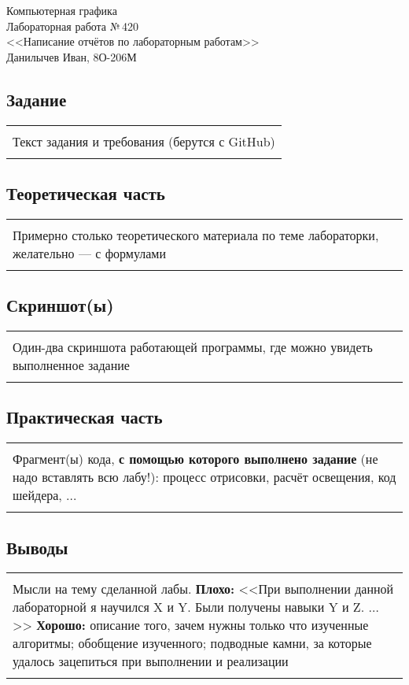 \documentclass[12pt]{article}
\newcommand{\StudentName}{Данилычев Иван}
\newcommand{\Group}{8О-206М}
\newcommand{\CourseName}{Компьютерная графика}
\newcommand{\LabNum}{420}
\newcommand{\Subject}{Написание отчётов по лабораторным работам}
\newcommand{\Descriptive}[2]
{
	\begin{tabularx}{\textwidth}{|X|}
	\hline
	\\[#1em]
	#2 \\
	\\[#1em]
	\hline
	\end{tabularx}
}
\begin{document}
\begin{flushright}
\Large{
	\CourseName \\
	Лабораторная работа №\,\LabNum \\
	<<\Subject>> \\
	\StudentName, \Group \\
}
\end{flushright}

\subsection*{Задание}
\Descriptive{5}{Текст задания и требования (берутся с GitHub)}

\subsection*{Теоретическая часть}
\Descriptive{10}{Примерно столько теоретического материала по теме лабораторки, желательно --- с формулами}

\subsection*{Скриншот(ы)}
\Descriptive{2}{Один-два скриншота работающей программы, где можно увидеть выполненное задание}

\subsection*{Практическая часть}
\Descriptive{15}{Фрагмент(ы) кода, \textbf{с помощью которого выполнено задание} (не надо вставлять всю лабу!): процесс отрисовки, расчёт освещения, код шейдера, $\ldots$}

\subsection*{Выводы}
\Descriptive{3}{
Мысли на тему сделанной лабы. \textbf{Плохо:} <<При выполнении данной лабораторной я научился X и Y. Были получены навыки Y и Z. $\ldots$>> \textbf{Хорошо:} описание того, зачем нужны только что изученные алгоритмы; обобщение изученного; подводные камни, за которые удалось зацепиться при выполнении и реализации
}
\end{document}
